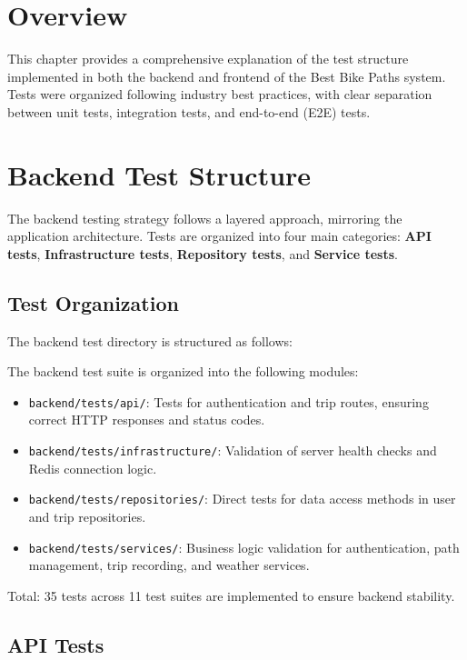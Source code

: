 \section{Overview}
\label{sec:testing_overview}

This chapter provides a comprehensive explanation of the test structure implemented in both the backend and frontend of the Best Bike Paths system. Tests were organized following industry best practices, with clear separation between unit tests, integration tests, and end-to-end (E2E) tests.

\section{Backend Test Structure}
\label{sec:backend_test_structure}

The backend testing strategy follows a layered approach, mirroring the application architecture. Tests are organized into four main categories: \textbf{API tests}, \textbf{Infrastructure tests}, \textbf{Repository tests}, and \textbf{Service tests}.

\subsection{Test Organization}
\label{subsec:backend_test_organization}

The backend test directory is structured as follows:

The backend test suite is organized into the following modules:
\begin{itemize}
    \item \texttt{backend/tests/api/}: Tests for authentication and trip routes, ensuring correct HTTP responses and status codes.
    \item \texttt{backend/tests/infrastructure/}: Validation of server health checks and Redis connection logic.
    \item \texttt{backend/tests/repositories/}: Direct tests for data access methods in user and trip repositories.
    \item \texttt{backend/tests/services/}: Business logic validation for authentication, path management, trip recording, and weather services.
\end{itemize}

Total: 35 tests across 11 test suites are implemented to ensure backend stability.

\subsection{API Tests}
\label{subsec:api_tests}

